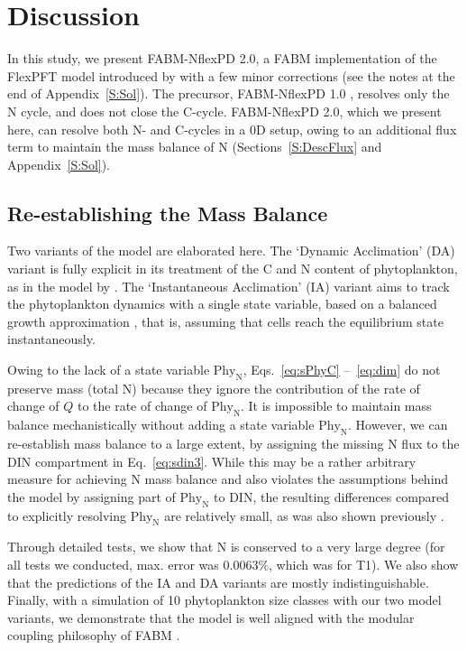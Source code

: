 \documentclass[gmd, manuscript]{copernicus}
\begin{document}
\FloatBarrier%
\section{Discussion}

In this study, we present FABM-NflexPD 2.0, a FABM implementation of the FlexPFT model introduced by \citet{Smith2016} with a few minor corrections (see the notes at the end of Appendix~\ref{S:Sol}). The precursor, FABM-NflexPD 1.0 \citep[K21,][]{Kerimoglu2021}, resolves only the N cycle, and does not close the C-cycle.  FABM-NflexPD 2.0, which we present here, can resolve both N- and C-cycles in a 0D setup, owing to an additional flux term to maintain the mass balance of N (Sections~\ref{S:DescFlux} and Appendix~\ref{S:Sol}).

\subsection{Re-establishing the Mass Balance}

Two variants of the model are elaborated here. The `Dynamic Acclimation' (DA) variant is fully explicit in its treatment of the C and N content of phytoplankton, as in the model by \citet{Fernandez-Castro2016}. The `Instantaneous Acclimation' (IA) variant aims to track the phytoplankton dynamics with a single state variable, based on a balanced growth approximation \citep{Burmaster1979}, that is, assuming that cells reach the equilibrium state instantaneously.

Owing to the lack of a state variable $\text{Phy}_{\text{N}}$, Eqs.~\eqref{eq:sPhyC} --~\eqref{eq:dim} do not preserve mass (total N) because they ignore the contribution of the rate of change of $Q$ to the rate of change of $\text{Phy}_{\text{N}}$.  It is impossible to maintain mass balance mechanistically without adding a state variable $\text{Phy}_{\text{N}}$.  However, we can re-establish mass balance to a large extent, by assigning the missing N flux to the DIN compartment in Eq.~\eqref{eq:sdin3}.  While this may be a rather arbitrary measure for achieving N mass balance and also violates the assumptions behind the model by assigning part of $\text{Phy}_{\text{N}}$ to DIN, the resulting differences compared to explicitly resolving $\text{Phy}_{\text{N}}$ are relatively small, as was also shown previously \citep{Ward2017}.

Through detailed tests, we show that N is conserved  to a very large degree (for all tests we conducted, max. error was $0.0063\%$, which was for T1). We also show that the predictions of the IA and DA variants are mostly indistinguishable. Finally, with a simulation of 10 phytoplankton size classes with our two model variants, we demonstrate that the model is well aligned with the modular coupling philosophy of FABM \citep{Bruggeman2014}.
\end{document}

